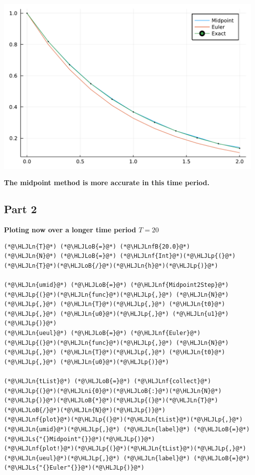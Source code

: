\documentclass[12pt,a4paper]{article}
\newcommand{\HLJLn}[1]{#1}
\newcommand{\HLJLnf}[1]{\textcolor[RGB]{66,102,213}{#1}}
\newcommand{\HLJLs}[1]{\textcolor[RGB]{201,61,57}{#1}}
\newcommand{\HLJLnfB}[1]{\textcolor[RGB]{59,151,46}{#1}}
\newcommand{\HLJLni}[1]{\textcolor[RGB]{59,151,46}{#1}}
\newcommand{\HLJLoB}[1]{\textcolor[RGB]{102,102,102}{\textbf{#1}}}
\newcommand{\HLJLp}[1]{#1}
\begin{document}
\includegraphics[width=\linewidth]{figures/ass_1_report_11_1.pdf}

\textbf{The midpoint method is more accurate in this time period.}

\subsection{Part 2}
\textbf{Ploting now over a longer time period $T = 20$}


\begin{lstlisting}
(*@\HLJLn{T}@*) (*@\HLJLoB{=}@*) (*@\HLJLnfB{20.0}@*)
(*@\HLJLn{N}@*) (*@\HLJLoB{=}@*) (*@\HLJLnf{Int}@*)(*@\HLJLp{(}@*)(*@\HLJLn{T}@*)(*@\HLJLoB{/}@*)(*@\HLJLn{h}@*)(*@\HLJLp{)}@*)

(*@\HLJLn{umid}@*) (*@\HLJLoB{=}@*) (*@\HLJLnf{Midpoint2Step}@*)(*@\HLJLp{(}@*)(*@\HLJLn{func}@*)(*@\HLJLp{,}@*) (*@\HLJLn{N}@*)(*@\HLJLp{,}@*) (*@\HLJLn{T}@*)(*@\HLJLp{,}@*) (*@\HLJLn{t0}@*)(*@\HLJLp{,}@*) (*@\HLJLn{u0}@*)(*@\HLJLp{,}@*) (*@\HLJLn{u1}@*)(*@\HLJLp{)}@*)
(*@\HLJLn{ueul}@*) (*@\HLJLoB{=}@*) (*@\HLJLnf{Euler}@*)(*@\HLJLp{(}@*)(*@\HLJLn{func}@*)(*@\HLJLp{,}@*) (*@\HLJLn{N}@*)(*@\HLJLp{,}@*) (*@\HLJLn{T}@*)(*@\HLJLp{,}@*) (*@\HLJLn{t0}@*)(*@\HLJLp{,}@*) (*@\HLJLn{u0}@*)(*@\HLJLp{)}@*)

(*@\HLJLn{tList}@*) (*@\HLJLoB{=}@*) (*@\HLJLnf{collect}@*)(*@\HLJLp{(}@*)(*@\HLJLni{0}@*)(*@\HLJLoB{:}@*)(*@\HLJLn{N}@*)(*@\HLJLp{)}@*)(*@\HLJLoB{*}@*)(*@\HLJLp{(}@*)(*@\HLJLn{T}@*)(*@\HLJLoB{/}@*)(*@\HLJLn{N}@*)(*@\HLJLp{)}@*)
(*@\HLJLnf{plot}@*)(*@\HLJLp{(}@*)(*@\HLJLn{tList}@*)(*@\HLJLp{,}@*)(*@\HLJLn{umid}@*)(*@\HLJLp{,}@*) (*@\HLJLn{label}@*) (*@\HLJLoB{=}@*) (*@\HLJLs{"{}Midpoint"{}}@*)(*@\HLJLp{)}@*)
(*@\HLJLnf{plot!}@*)(*@\HLJLp{(}@*)(*@\HLJLn{tList}@*)(*@\HLJLp{,}@*)(*@\HLJLn{ueul}@*)(*@\HLJLp{,}@*) (*@\HLJLn{label}@*) (*@\HLJLoB{=}@*) (*@\HLJLs{"{}Euler"{}}@*)(*@\HLJLp{)}@*)
\end{lstlisting}
\end{document}
